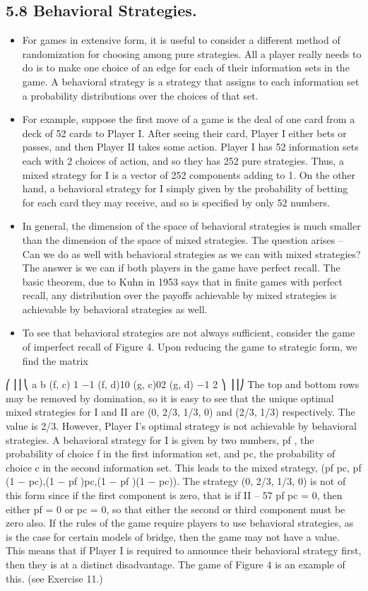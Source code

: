 \begin{framed}
\begin{itemize}
\subsection{5.8 Behavioral Strategies.} 
\begin{itemize}
\item For games in extensive form, it is useful to consider a
different method of randomization for choosing among pure strategies. All a player really
needs to do is to make one choice of an edge for each of their information sets in the game.
A behavioral strategy is a strategy that assigns to each information set a probability
distributions over the choices of that set.
\item For example, suppose the first move of a game is the deal of one card from a deck of
52 cards to Player I. After seeing their card, Player I either bets or passes, and then Player
II takes some action. Player I has 52 information sets each with 2 choices of action, and
so they has 252 pure strategies. Thus, a mixed strategy for I is a vector of 252 components
adding to 1. On the other hand, a behavioral strategy for I simply given by the probability
of betting for each card they may receive, and so is specified by only 52 numbers.
\item In general, the dimension of the space of behavioral strategies is much smaller than
the dimension of the space of mixed strategies. The question arises – Can we do as well
with behavioral strategies as we can with mixed strategies? The answer is we can if both
players in the game have perfect recall. The basic theorem, due to Kuhn in 1953 says that
in finite games with perfect recall, any distribution over the payoffs achievable by mixed
strategies is achievable by behavioral strategies as well.
\item To see that behavioral strategies are not always sufficient, consider the game of imperfect
recall of Figure 4. Upon reducing the game to strategic form, we find the matrix
\end{itemize}
⎛
⎜⎜⎝
a b
(f, c) 1 −1
(f, d)10
(g, c)02
(g, d) −1 2
⎞
⎟⎟⎠
The top and bottom rows may be removed by domination, so it is easy to see that the
unique optimal mixed strategies for I and II are (0, 2/3, 1/3, 0) and (2/3, 1/3) respectively.
The value is 2/3. However, Player I’s optimal strategy is not achievable by behavioral
strategies. A behavioral strategy for I is given by two numbers, pf , the probability of choice
f in the first information set, and pc, the probability of choice c in the second information
set. This leads to the mixed strategy, (pf pc, pf (1 − pc),(1 − pf )pc,(1 − pf )(1 − pc)). The
strategy (0, 2/3, 1/3, 0) is not of this form since if the first component is zero, that is if
II – 57
pf pc = 0, then either pf = 0 or pc = 0, so that either the second or third component must
be zero also.
If the rules of the game require players to use behavioral strategies, as is the case for
certain models of bridge, then the game may not have a value. This means that if Player I
is required to announce their behavioral strategy first, then they is at a distinct disadvantage.
The game of Figure 4 is an example of this. (see Exercise 11.)

\end{itemize}
\end{framed}
